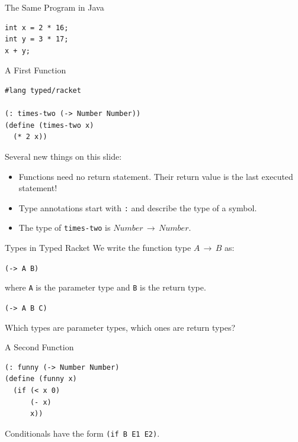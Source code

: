 \documentclass{beamer}
\begin{document}
\begin{frame}[fragile]{The Same Program in Java}
\begin{lstlisting}[style=Java]
int x = 2 * 16;
int y = 3 * 17;
x + y;
\end{lstlisting}
\end{frame}

\begin{frame}[fragile]{A First Function}
\begin{lstlisting}
#lang typed/racket

(: times-two (-> Number Number))
(define (times-two x)
  (* 2 x))
\end{lstlisting}

\pause{}

Several new things on this slide:

\begin{itemize}
\pause{} \item Functions need no return statement. Their return value is the last executed statement!
\pause{} \item Type annotations start with \lstinline{:} and describe the type of a symbol.
\pause{} \item The type of \lstinline{times-two} is $Number \, \rightarrow \, Number$.
\end{itemize}
\end{frame}

\begin{frame}[fragile]{Types in Typed Racket}
We write the function type $A \, \rightarrow \, B$ as:

\begin{center}
  \lstinline{(-> A B)}
\end{center}

where \lstinline{A} is the parameter type and \lstinline{B} is the return type.

\vspace{1.5cm}

\pause{}

\begin{center}
  \lstinline{(-> A B C)}
\end{center}

Which types are parameter types, which ones are return types?
\end{frame}

\begin{frame}[fragile]{A Second Function}
\begin{lstlisting}
(: funny (-> Number Number)
(define (funny x)
  (if (< x 0)
      (- x)
      x))
\end{lstlisting}

\vspace{1.5cm}

\pause{}

Conditionals have the form \lstinline{(if B E1 E2)}.
\end{frame}
\end{document}
